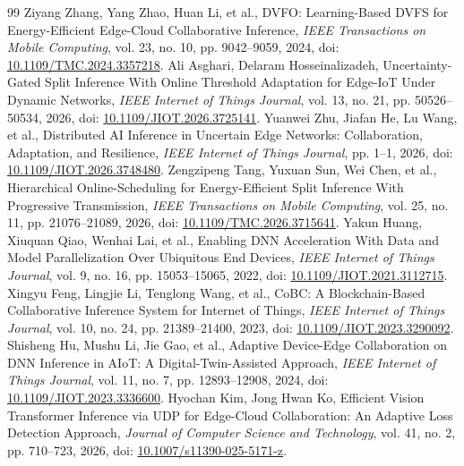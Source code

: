 \documentclass[10pt,a4paper,twocolumn]{article}
\begin{document}
\begin{thebibliography}{99}
 Ziyang Zhang, Yang Zhao, Huan Li, et al., DVFO: Learning-Based DVFS for Energy-Efficient Edge-Cloud Collaborative Inference, \emph{IEEE Transactions on Mobile Computing}, vol. 23, no. 10, pp. 9042--9059, 2024, doi: \href{https://doi.org/10.1109/TMC.2024.3357218}{10.1109/TMC.2024.3357218}.
 Ali Asghari, Delaram Hosseinalizadeh, Uncertainty-Gated Split Inference With Online Threshold Adaptation for Edge-IoT Under Dynamic Networks, \emph{IEEE Internet of Things Journal}, vol. 13, no. 21, pp. 50526--50534, 2026, doi: \href{https://doi.org/10.1109/JIOT.2026.3725141}{10.1109/JIOT.2026.3725141}.
 Yuanwei Zhu, Jiafan He, Lu Wang, et al., Distributed AI Inference in Uncertain Edge Networks: Collaboration, Adaptation, and Resilience, \emph{IEEE Internet of Things Journal}, pp. 1--1, 2026, doi: \href{https://doi.org/10.1109/JIOT.2026.3748480}{10.1109/JIOT.2026.3748480}.
 Zengzipeng Tang, Yuxuan Sun, Wei Chen, et al., Hierarchical Online-Scheduling for Energy-Efficient Split Inference With Progressive Transmission, \emph{IEEE Transactions on Mobile Computing}, vol. 25, no. 11, pp. 21076--21089, 2026, doi: \href{https://doi.org/10.1109/TMC.2026.3715641}{10.1109/TMC.2026.3715641}.
 Yakun Huang, Xiuquan Qiao, Wenhai Lai, et al., Enabling DNN Acceleration With Data and Model Parallelization Over Ubiquitous End Devices, \emph{IEEE Internet of Things Journal}, vol. 9, no. 16, pp. 15053--15065, 2022, doi: \href{https://doi.org/10.1109/JIOT.2021.3112715}{10.1109/JIOT.2021.3112715}.
 Xingyu Feng, Lingjie Li, Tenglong Wang, et al., CoBC: A Blockchain-Based Collaborative Inference System for Internet of Things, \emph{IEEE Internet of Things Journal}, vol. 10, no. 24, pp. 21389--21400, 2023, doi: \href{https://doi.org/10.1109/JIOT.2023.3290092}{10.1109/JIOT.2023.3290092}.
 Shisheng Hu, Mushu Li, Jie Gao, et al., Adaptive Device-Edge Collaboration on DNN Inference in AIoT: A Digital-Twin-Assisted Approach, \emph{IEEE Internet of Things Journal}, vol. 11, no. 7, pp. 12893--12908, 2024, doi: \href{https://doi.org/10.1109/JIOT.2023.3336600}{10.1109/JIOT.2023.3336600}.
 Hyochan Kim, Jong Hwan Ko, Efficient Vision Transformer Inference via UDP for Edge-Cloud Collaboration: An Adaptive Loss Detection Approach, \emph{Journal of Computer Science and Technology}, vol. 41, no. 2, pp. 710--723, 2026, doi: \href{https://doi.org/10.1007/s11390-025-5171-z}{10.1007/s11390-025-5171-z}.
\end{thebibliography}
\end{document}
